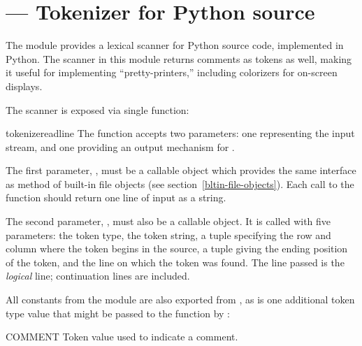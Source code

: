 \section{ ---
         Tokenizer for Python source}



The  module provides a lexical scanner for Python
source code, implemented in Python.  The scanner in this module
returns comments as tokens as well, making it useful for implementing
``pretty-printers,'' including colorizers for on-screen displays.

The scanner is exposed via single function:


\begin{funcdesc}{tokenize}{readline}
  The  function accepts two parameters: one
  representing the input stream, and one providing an output mechanism 
  for .

  The first parameter, , must be a callable object which
  provides the same interface as  method of
  built-in file objects (see section~\ref{bltin-file-objects}).  Each
  call to the function should return one line of input as a string.

  The second parameter, , must also be a callable
  object.  It is called with five parameters: the token type, the
  token string, a tuple  specifying the 
  row and column where the token begins in the source, a tuple
   giving the ending position of the
  token, and the line on which the token was found.  The line passed
  is the \emph{logical} line; continuation lines are included.
\end{funcdesc}


All constants from the  module are also exported from 
, as is one additional token type value that might be 
passed to the  function by :

\begin{datadesc}{COMMENT}
  Token value used to indicate a comment.
\end{datadesc}
